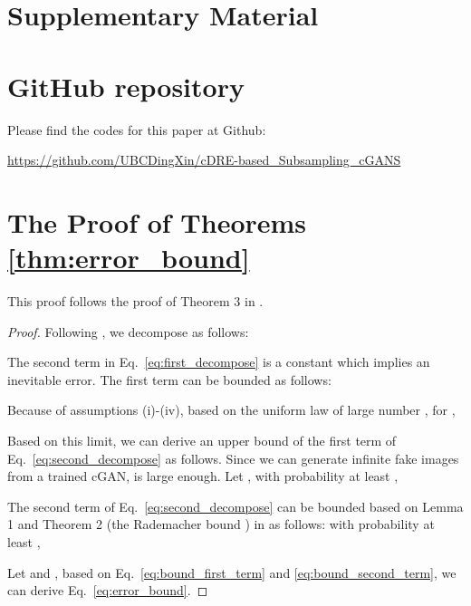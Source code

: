 \documentclass[10pt, twocolumn]{article}
\theoremstyle{definition}
\begin{document}
\clearpage
\newpage




\clearpage
\newpage
\appendix

\section*{Supplementary Material}


\renewcommand{\thesection}{S.\arabic{section}} 
\renewcommand{\thesubsection}{\thesection.\arabic{subsection}}
\renewcommand\thefigure{\thesection.\arabic{figure}}
\renewcommand\thetable{\thesection.\arabic{table}}
\renewcommand{\theequation}{S.\arabic{equation}}
\renewcommand{\thetheorem}{S.\arabic{theorem}} 
\renewcommand{\thedefinition}{S.\arabic{definition}} 
\renewcommand{\thelemma}{S.\arabic{lemma}} 
\renewcommand{\theremark}{S.\arabic{remark}}


\section{GitHub repository}\label{supp:codes}
Please find the codes for this paper at Github:
\begin{center}
	\url{https://github.com/UBCDingXin/cDRE-based_Subsampling_cGANS}
\end{center}



\section{The Proof of Theorems \ref{thm:error_bound}}\label{supp:proofs}
This proof follows the proof of Theorem 3 in \cite{ding2020subsampling}. 

\begin{proof}
	Following \cite{ding2020subsampling}, we decompose  as follows:
	
	The second term in Eq.\ \eqref{eq:first_decompose} is a constant which implies an inevitable error. The first term can be bounded as follows:
	
	
	Because of assumptions (i)-(iv), based on the uniform law of large number \cite{noteULLN}, for ,
	
	
	Based on this limit, we can derive an upper bound of the first term of Eq.\ \eqref{eq:second_decompose} as follows. Since we can generate infinite fake images from a trained cGAN,  is large enough. Let ,  with probability at least , 
	
	
	The second term of Eq.\ \eqref{eq:second_decompose} can be bounded based on Lemma 1 and Theorem 2 (the Rademacher bound \cite{lafferty2010}) in \cite{ding2020subsampling} as follows:  with probability at least ,
	
	Let  and , based on Eq.\ \eqref{eq:bound_first_term} and \eqref{eq:bound_second_term}, we can derive Eq.\ \eqref{eq:error_bound}.
\end{proof}
\end{document}
